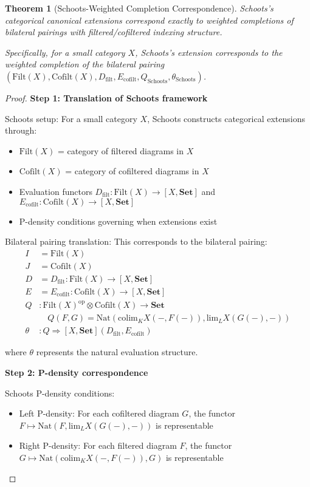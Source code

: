 \documentclass[11pt]{article}
\theoremstyle{plain}
\newtheorem{theorem}{Theorem}[section]
\theoremstyle{definition}
\theoremstyle{remark}
\newcommand{\op}{\mathrm{op}}
\newcommand{\colim}{\mathrm{colim}}
\renewcommand{\lim}{\mathrm{lim}}
\begin{document}
\begin{theorem}[Schoots-Weighted Completion Correspondence]\label{thm:schoots-correspondence}
Schoots's categorical canonical extensions correspond exactly to weighted completions of bilateral pairings with filtered/cofiltered indexing structure.

Specifically, for a small category $X$, Schoots's extension corresponds to the weighted completion of the bilateral pairing $(\text{Filt}(X), \text{Cofilt}(X), D_{\text{filt}}, E_{\text{cofilt}}, Q_{\text{Schoots}}, \theta_{\text{Schoots}})$.
\end{theorem}

\begin{proof}
\textbf{Step 1: Translation of Schoots framework}

Schoots setup: For a small category $X$, Schoots constructs categorical extensions through:
\begin{itemize}
\item $\text{Filt}(X)$ = category of filtered diagrams in $X$
\item $\text{Cofilt}(X)$ = category of cofiltered diagrams in $X$
\item Evaluation functors $D_{\text{filt}} : \text{Filt}(X) \to [X, \mathbf{Set}]$ and $E_{\text{cofilt}} : \text{Cofilt}(X) \to [X, \mathbf{Set}]$
\item P-density conditions governing when extensions exist
\end{itemize}

Bilateral pairing translation: This corresponds to the bilateral pairing:
\begin{align}
I &= \text{Filt}(X) \\
J &= \text{Cofilt}(X) \\
D &= D_{\text{filt}} : \text{Filt}(X) \to [X, \mathbf{Set}] \\
E &= E_{\text{cofilt}} : \text{Cofilt}(X) \to [X, \mathbf{Set}] \\
Q &: \text{Filt}(X)^{\op} \otimes \text{Cofilt}(X) \to \mathbf{Set} \\
&\quad Q(F, G) = \text{Nat}(\colim_K X(-, F(-)), \lim_L X(G(-), -)) \\
\theta &: Q \Rightarrow [X, \mathbf{Set}](D_{\text{filt}}, E_{\text{cofilt}})
\end{align}

where $\theta$ represents the natural evaluation structure.

\textbf{Step 2: P-density correspondence}

Schoots P-density conditions:
\begin{itemize}
\item Left P-density: For each cofiltered diagram $G$, the functor $F \mapsto \text{Nat}(F, \lim_L X(G(-), -))$ is representable
\item Right P-density: For each filtered diagram $F$, the functor $G \mapsto \text{Nat}(\colim_K X(-, F(-)), G)$ is representable
\end{itemize}


\end{proof}
\end{document}
